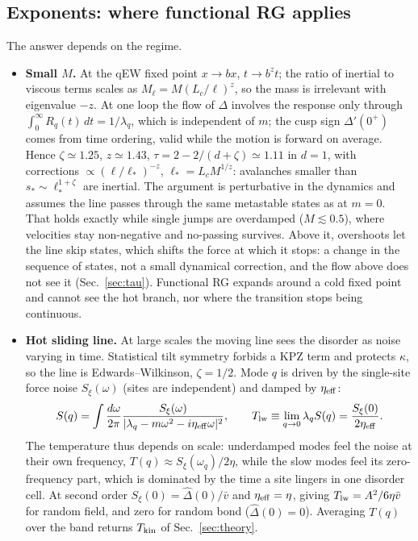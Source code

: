 \documentclass[10pt,a4paper]{article}
\begin{document}
\subsection{Exponents: where functional RG applies}
\label{sec:frg}
The answer depends on the regime.
\begin{itemize}
\item \textbf{Small $M$.} At the qEW fixed point $x\to bx$, $t\to b^zt$; the ratio of inertial to viscous terms scales as $M_\ell=M(L_c/\ell)^{z}$, so the mass is irrelevant with eigenvalue $-z$. At one loop the flow of $\Delta$ involves the response only through $\int_0^\infty R_q(t)\,dt=1/\lambda_q$, which is independent of $m$; the cusp sign $\Delta'(0^+)$ comes from time ordering, valid while the motion is forward on average. Hence $\zeta\simeq1.25$, $z\simeq1.43$, $\tau=2-2/(d+\zeta)\simeq1.11$ in $d=1$, with corrections $\propto(\ell/\ell_*)^{-z}$, $\ell_*=L_cM^{1/z}$: avalanches smaller than $s_*\sim\ell_*^{1+\zeta}$ are inertial. The argument is perturbative in the dynamics and assumes the line passes through the same metastable states as at $m=0$. That holds exactly while single jumps are overdamped ($M\lesssim0.5$), where velocities stay non-negative and no-passing survives. Above it, overshoots let the line skip states, which shifts the force at which it stops: a change in the sequence of states, not a small dynamical correction, and the flow above does not see it (Sec.~\ref{sec:tau}). Functional RG expands around a cold fixed point and cannot see the hot branch, nor where the transition stops being continuous.
\item \textbf{Hot sliding line.} At large scales the moving line sees the disorder as noise varying in time. Statistical tilt symmetry forbids a KPZ term and protects $\kappa$, so the line is Edwards--Wilkinson, $\zeta=1/2$. Mode $q$ is driven by the single-site force noise $S_\xi(\omega)$ (sites are independent) and damped by $\eta_{\rm eff}$:
\begin{equation}
S(q)=\int\frac{d\omega}{2\pi}\frac{S_\xi(\omega)}{|\lambda_q-m\omega^2-i\eta_{\rm eff}\omega|^2},\qquad
T_{\rm lw}\equiv\lim_{q\to0}\lambda_qS(q)=\frac{S_\xi(0)}{2\eta_{\rm eff}}.
\label{eq:Tlw}
\end{equation}
The temperature thus depends on scale: underdamped modes feel the noise at their own frequency, $T(q)\approx S_\xi(\omega_q)/2\eta$, while the slow modes feel its zero-frequency part, which is dominated by the time a site lingers in one disorder cell. At second order $S_\xi(0)=\hat\Delta(0)/\bar v$ and $\eta_{\rm eff}=\eta$, giving $T_{\rm lw}=A^2/6\eta\bar v$ for random field, and zero for random bond ($\hat\Delta(0)=0$). Averaging $T(q)$ over the band returns $T_{\rm kin}$ of Sec.~\ref{sec:theory}.

\end{itemize}
\end{document}
